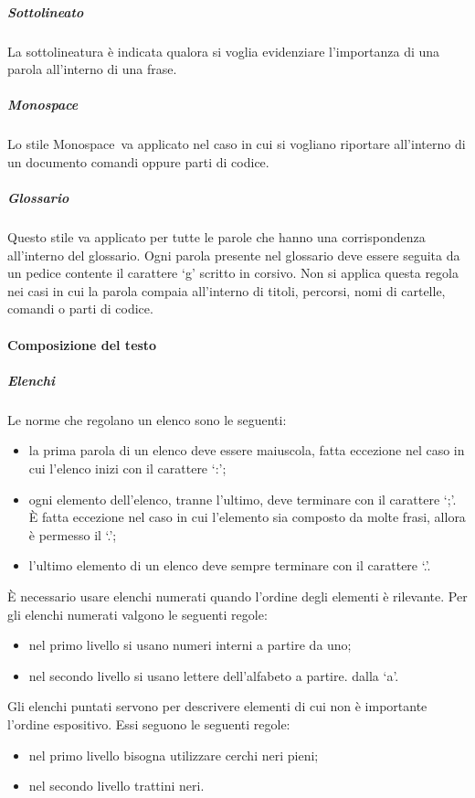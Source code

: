 \documentclass[../NormeProgetto.tex]{subfiles}
\begin{document}
			\subparagraph{Sottolineato}
				La sottolineatura è indicata qualora si voglia evidenziare l'importanza di una parola all'interno di una frase.					
			
			\subparagraph{Monospace}
				Lo stile Monospace\g\ va applicato nel caso in cui si vogliano riportare all'interno di un documento	comandi oppure parti di codice.
			
			\subparagraph{Glossario}\label{sec:Formattazione termini nel glossario}
				Questo stile va applicato per tutte le parole che hanno una corrispondenza all'interno del glossario. Ogni parola presente nel glossario deve essere seguita da un pedice contente il carattere `g' scritto in corsivo. Non si applica questa regola nei casi in cui la parola compaia all'interno di titoli, percorsi, nomi di cartelle, comandi o parti di codice.
			
		\paragraph{Composizione del testo}
			\subparagraph{Elenchi}
				Le norme che regolano un elenco sono le seguenti:
				\begin{itemize}
					\item la prima parola di un elenco deve essere maiuscola, fatta eccezione nel caso in cui l'elenco inizi con il carattere `:';
					\item ogni elemento dell'elenco, tranne l'ultimo, deve terminare con il carattere `;'. È fatta eccezione nel caso in cui l'elemento sia composto da molte frasi, allora è permesso il `.';
					\item l'ultimo elemento di un elenco deve sempre terminare con il carattere `.'.
				\end{itemize}
				È necessario usare elenchi numerati quando l'ordine degli elementi è rilevante. Per gli elenchi numerati valgono le seguenti regole:
				\begin{itemize}
					\item nel primo livello si usano numeri interni a partire da uno;
					\item nel secondo livello si usano lettere dell'alfabeto a partire. dalla `a'.
				\end{itemize}
				Gli elenchi puntati servono per descrivere elementi di cui non è importante l'ordine espositivo. Essi seguono le seguenti regole:
				\begin{itemize}
					\item nel primo livello bisogna utilizzare cerchi neri pieni;
					\item nel secondo livello trattini neri.
				\end{itemize}
			
\end{document}
